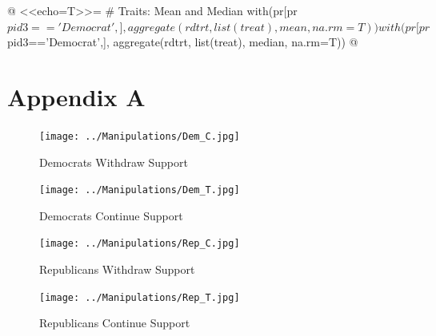 \documentclass[12pt]{article}
\begin{document}
@
\clearpage
\singlespacing
<<echo=T>>=
	# Traits: Mean and Median 
	with(pr[pr$pid3=='Democrat',], aggregate(rdtrt, list(treat), mean, na.rm=T))
	with(pr[pr$pid3=='Democrat',], aggregate(rdtrt, list(treat), median, na.rm=T))
@
\clearpage
\section*{Appendix A}


\begin{figure}[ht]
\centering
\begin{minipage}[b][12cm][b]{0.45\linewidth}
\texttt{[image: ../Manipulations/Dem\_C.jpg]}
\caption{Democrats Withdraw Support}
\label{fig:minipage1}
\end{minipage}
\quad
\begin{minipage}[b]{0.45\linewidth}
\texttt{[image: ../Manipulations/Dem\_T.jpg]}
\caption{Democrats Continue Support}
\label{fig:minipage2}
\end{minipage}
\end{figure}

\begin{figure}[ht]
\centering
\begin{minipage}[b][12cm][b]{0.45\linewidth}
\texttt{[image: ../Manipulations/Rep\_C.jpg]}
\caption{Republicans Withdraw Support}
\label{fig:minipage3}
\end{minipage}
\quad
\begin{minipage}[b]{0.45\linewidth}
\texttt{[image: ../Manipulations/Rep\_T.jpg]}
\caption{Republicans Continue Support}
\label{fig:minipage4}
\end{minipage}
\end{figure}
\end{document}
